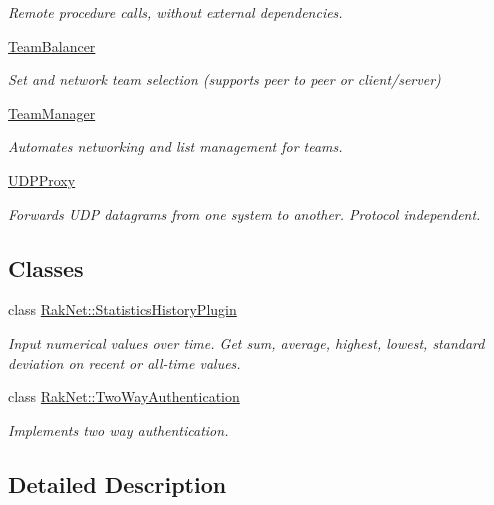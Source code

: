 \begin{DoxyCompactItemize}
\begin{DoxyCompactList}\small\item\em Remote procedure calls, without external dependencies. \end{DoxyCompactList}\item 
\hyperlink{group___t_e_a_m___b_a_l_a_n_c_e_r___g_r_o_u_p}{Team\-Balancer}
\begin{DoxyCompactList}\small\item\em Set and network team selection (supports peer to peer or client/server) \end{DoxyCompactList}\item 
\hyperlink{group___t_e_a_m___m_a_n_a_g_e_r___g_r_o_u_p}{Team\-Manager}
\begin{DoxyCompactList}\small\item\em Automates networking and list management for teams. \end{DoxyCompactList}\item 
\hyperlink{group___u_d_p___p_r_o_x_y___g_r_o_u_p}{U\-D\-P\-Proxy}
\begin{DoxyCompactList}\small\item\em Forwards U\-D\-P datagrams from one system to another. Protocol independent. \end{DoxyCompactList}\end{DoxyCompactItemize}
\subsection*{Classes}
\begin{DoxyCompactItemize}
\item 
class \hyperlink{class_rak_net_1_1_statistics_history_plugin}{Rak\-Net\-::\-Statistics\-History\-Plugin}
\begin{DoxyCompactList}\small\item\em Input numerical values over time. Get sum, average, highest, lowest, standard deviation on recent or all-\/time values. \end{DoxyCompactList}\item 
class \hyperlink{class_rak_net_1_1_two_way_authentication}{Rak\-Net\-::\-Two\-Way\-Authentication}
\begin{DoxyCompactList}\small\item\em Implements two way authentication. \end{DoxyCompactList}\end{DoxyCompactItemize}


\subsection{Detailed Description}

